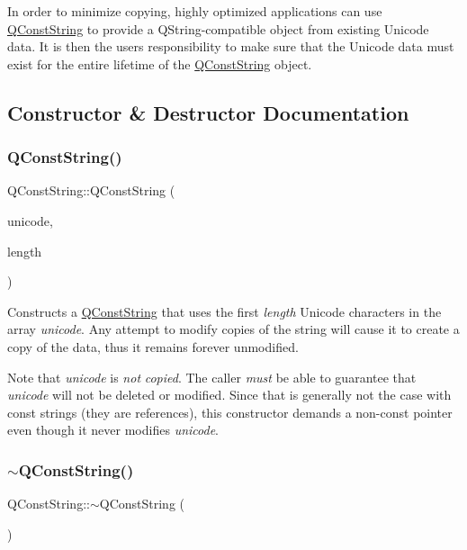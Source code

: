 In order to minimize copying, highly optimized applications can use \mbox{\hyperlink{class_q_const_string}{Q\+Const\+String}} to provide a Q\+String-\/compatible object from existing Unicode data. It is then the user\textquotesingle{}s responsibility to make sure that the Unicode data must exist for the entire lifetime of the \mbox{\hyperlink{class_q_const_string}{Q\+Const\+String}} object. 

\subsection{Constructor \& Destructor Documentation}
\mbox{\label{class_q_const_string_afb12679c48e62fbd2ffc14f9ef8b9159}} 
\subsubsection{\texorpdfstring{QConstString()}{QConstString()}}
{\footnotesize\ttfamily Q\+Const\+String\+::\+Q\+Const\+String (\begin{DoxyParamCaption}\item[{\mbox{\hyperlink{class_q_char}{Q\+Char}} $\ast$}]{unicode,  }\item[{uint}]{length }\end{DoxyParamCaption})}

Constructs a \mbox{\hyperlink{class_q_const_string}{Q\+Const\+String}} that uses the first {\itshape length} Unicode characters in the array {\itshape unicode}. Any attempt to modify copies of the string will cause it to create a copy of the data, thus it remains forever unmodified.

Note that {\itshape unicode} is {\itshape not} {\itshape copied}. The caller {\itshape must} be able to guarantee that {\itshape unicode} will not be deleted or modified. Since that is generally not the case with {\ttfamily const} strings (they are references), this constructor demands a non-\/const pointer even though it never modifies {\itshape unicode}. \mbox{\label{class_q_const_string_a60c8ed0e36b404ed3d39ab399033facc}} 
\subsubsection{\texorpdfstring{$\sim$QConstString()}{~QConstString()}}
{\footnotesize\ttfamily Q\+Const\+String\+::$\sim$\+Q\+Const\+String (\begin{DoxyParamCaption}{ }\end{DoxyParamCaption})}

